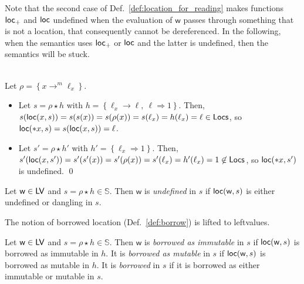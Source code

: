 \noindent
Note that the second case of Def.~\ref{def:location_for_reading}
makes functions $\mathsf{loc_+}$ and $\mathsf{loc}$
undefined when the evaluation of $\mathsf{w}$ passes through something that is not
a location, that consequently cannot be dereferenced.
In the following, when the semantics
uses $\mathsf{loc_+}$ or $\mathsf{loc}$ and the latter is undefined, then the semantics will be stuck.

\begin{example}
  \\
  Let $\rho = \left\{x\to^m\ell_x\right\}$.
  \begin{itemize}
    \item Let $s = \rho\star h$ with
    $h = \left\{\ell_x\to\ell,\ \ell\Rightarrow 1\right\}$.
    Then, $s(\mathsf{loc}(x,s)) = s(s(x)) = s(\rho(x)) = s(\ell_x) =
    h(\ell_x) = \ell\in\mathsf{Locs}$, so
    $\mathsf{loc}(\mathtt{*}x,s)= s(\mathsf{loc}(x,s)) = \ell$.
    \item Let $s' = \rho\star h'$ with
    $h' = \left\{\ell_x\Rightarrow 1\right\}$. Then,
    $s'(\mathsf{loc}(x,s')) = s'(s'(x)) = s'(\rho(x)) = s'(\ell_x) =
    h'(\ell_x) = 1 \not\in\mathsf{Locs}$, so $\mathsf{loc}(\mathtt{*}x,s')$ is undefined.
    \qed
  \end{itemize}
\end{example}

\begin{definition}\label{def:undefined_leftvalues}
  Let $\mathsf{w}\in\mathsf{LV}$ and $s=\rho\star h\in\mathbb{S}$. Then
  $\mathsf{w}$ is \emph{undefined} in $s$ if $\mathsf{loc}(\mathsf{w},s)$ is either undefined
  or dangling in $s$.
\end{definition}



The notion of borrowed location (Def.~\ref{def:borrow}) is lifted to leftvalues.

\begin{definition}\label{def:borrowed_leftvalues}
  Let $\mathsf{w}\in\mathsf{LV}$ and $s=\rho\star h\in\mathbb{S}$. Then
  $\mathsf{w}$ is \emph{borrowed as immutable} in $s$
  if $\mathsf{loc}(\mathsf{w},s)$ is borrowed as
  immutable in $h$. It is \emph{borrowed as mutable} in $s$ if
  $\mathsf{loc}(\mathsf{w},s)$ is borrowed as
  mutable in $h$. It is \emph{borrowed} in $s$
  if it is borrowed as either immutable or mutable in $s$.
\end{definition}

